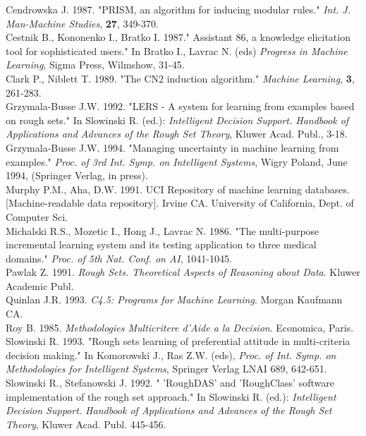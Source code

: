 {\footnotesize
\noindent
Cendrowska J. 1987. "PRISM, an algorithm for inducing modular
rules." {\it Int. J. Man-Machine Studies}, {\bf 27}, 349-370.\\
Cestnik B., Kononenko I., Bratko I. 1987." Assistant  86,  a
knowledge elicitation tool for sophisticated users."  In  Bratko  I.,
Lavrac N. (eds) {\it Progress  in  Machine  Learning}, Sigma  Press,
Wilmshow, 31-45.\\
Clark P., Niblett T.  1989. "The CN2 induction algorithm."
{\it Machine Learning}, {\bf 3}, 261-283.\\
Grzymala-Busse J.W. 1992. "LERS - A system for learning from
examples based on rough sets." In Slowinski R. (ed.): {\it Intelligent
Decision Support. Handbook of Applications and Advances of the  Rough
Set Theory}, Kluwer Acad. Publ., 3-18.\\
Grzymala-Busse J.W. 1994. "Managing uncertainty in machine
learning from examples." {\it Proc. of 3rd  Int.  Symp.  on  Intelligent
Systems}, Wigry Poland, June 1994, (Springer Verlag, in press).\\
Murphy P.M., Aha, D.W. 1991. UCI Repository of machine learning
databases. [Machine-readable data repository]. Irvine  CA.  University
of California, Dept. of Computer Sci.\\
Michalski R.S., Mozetic  I.,  Hong  J.,  Lavrac  N. 1986. "The
multi-purpose incremental learning system and its testing application
to three medical domains." {\it Proc. of 5th Nat. Conf. on AI},
1041-1045.\\
Pawlak Z. 1991. {\it Rough Sets. Theoretical Aspects of Reasoning
about Data}. Kluwer Academic Publ. \\
Quinlan J.R. 1993. {\it C4.5: Programs for Machine Learning}.
Morgan Kaufmann CA.\\
Roy B. 1985.  {\it  Methodologies  Multicritere  d'Aide  a  la
Decision}. Economica, Paris.\\
Slowinski  R. 1993.  "Rough  sets  learning  of
preferential  attitude  in   multi-criteria   decision   making."   In
Komorowski  J.,  Ras  Z.W.  (eds),  {\it  Proc.  of  Int.   Symp.   on
Methodologies for Intelligent Systems},  Springer  Verlag  LNAI  689,
 642-651.\\
Slowinski   R.,   Stefanowski   J. 1992. " 'RoughDAS'   and
'RoughClass' software implementation of the rough  set  approach."  In
Slowinski R. (ed.): {\it Intelligent Decision  Support.  Handbook  of
Applications and Advances of the Rough Set Theory}, Kluwer Acad. Publ.
 445-456.\\
}
